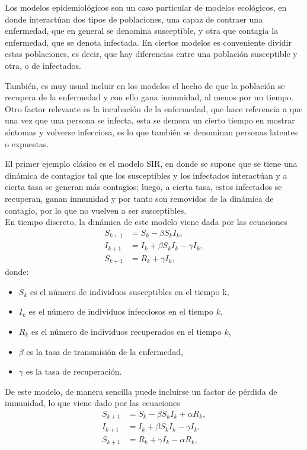 Los modelos epidemiológicos son un caso particular de modelos ecológicos, en donde interactúan dos tipos de poblaciones, una capaz de contraer una enfermedad, que en general se denomina susceptible, y otra que contagia la enfermedad, que se denota infectada. En ciertos modelos es conveniente dividir estas poblaciones, es decir, que hay diferencias entre una población susceptible y otra, o de infectados.

También, es muy usual incluir en los modelos el hecho de que la población se recupera de la enfermedad y con ello gana inmunidad, al menos por un tiempo. Otro factor relevante es la incubación de la enfermedad, que hace referencia a que una vez que una persona se infecta, esta se demora un cierto tiempo en mostrar síntomas y volverse infecciosa, es lo que también se denominan personas latentes o expuestas.

El primer ejemplo clásico es el modelo SIR, en donde se supone que se tiene una dinámica de contagios tal que los susceptibles y los infectados interactúan y a cierta tasa se generan más contagios; luego, a cierta tasa, estos infectados se recuperan, ganan inmunidad y por tanto son removidos de la dinámica de contagio, por lo que no vuelven a ser susceptibles.\\
En tiempo discreto, la dinámica de este modelo viene dada por las ecuaciones
\begin{equation}
    \begin{aligned}
    S_{k+1} &= S_k -\beta S_k I_k, \\
    I_{k+1} &= I_k + \beta S_k I_k - \gamma I_k, \\
    S_{k+1} &= R_k + \gamma I_k,
    \end{aligned}
    \label{eq:SIR}
\end{equation}
donde:
\begin{itemize}
    \item \(S_k\) es el número de individuos susceptibles en el tiempo k,
    \item \(I_k\) es el número de individuos infecciosos en el tiempo \(k\),
    \item \(R_k\) es el número de individuos recuperados en el tiempo \(k\),
    \item \(\beta\) es la tasa de transmisión de la enfermedad,
    \item \(\gamma\) es la tasa de recuperación.
\end{itemize}

De este modelo, de manera sencilla puede incluirse un factor de pérdida de inmunidad, lo que viene dado por las ecuaciones
\begin{equation}
    \begin{aligned}
    S_{k+1} &= S_k -\beta S_k I_k + \alpha R_k, \\
    I_{k+1} &= I_k + \beta S_k I_k - \gamma I_k, \\
    S_{k+1} &= R_k + \gamma I_k - \alpha R_k,
    \end{aligned}
    \label{eq:SIR_rec}
\end{equation}

